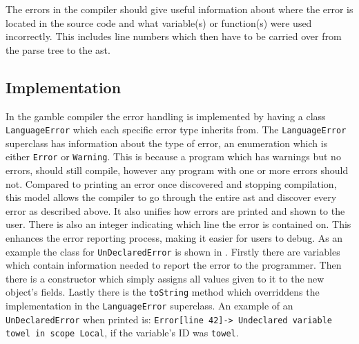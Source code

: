The errors in the compiler should give useful information about where the error is located in the source code and what variable(s) or function(s) were used incorrectly.
This includes line numbers which then have to be carried over from the parse tree to the \acrshort{ast}.

\subsection*{Implementation}\label{subsec:ImplementationErrorHandling}
In the \gls{gamble} compiler the error handling is implemented by having a class \texttt{LanguageError} which each specific error type inherits from.
The \texttt{LanguageError} superclass has information about the type of error, an enumeration which is either \texttt{Error} or \texttt{Warning}. 
This is because a program which has warnings but no errors, should still compile, however any program with one or more errors should not. 
Compared to printing an error once discovered and stopping compilation, this model allows the compiler to go through the entire \acrshort{ast} and discover every error as described above. 
It also unifies how errors are printed and shown to the user.
There is also an integer indicating which line the error is contained on.
This enhances the error reporting process, making it easier for users to debug. 
As an example the class for \texttt{UnDeclaredError} is shown in .
Firstly there are variables which contain information needed to report the error to the programmer. 
Then there is a constructor which simply assigns all values given to it to the new object's fields.
Lastly there is the \texttt{toString} method which overriddens the implementation in the \texttt{LanguageError} superclass. 
An example of an \texttt{UnDeclaredError} when printed is: \texttt{Error[line   42]-> Undeclared variable towel in scope Local}, if the variable's ID was \texttt{towel}. %

